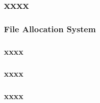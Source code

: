 \subsection{xxxx} %
\begin{frame}[fragile]
    \frametitle{File Allocation System}
\end{frame}
% 
% 
% 
\begin{frame}[fragile]
    \frametitle{xxxx}
\end{frame}
% 
% 
\begin{frame}[fragile]
    \frametitle{xxxx}
\end{frame}
% 
% 
\begin{frame}[fragile]
    \frametitle{xxxx}
\end{frame}
% 
% 

